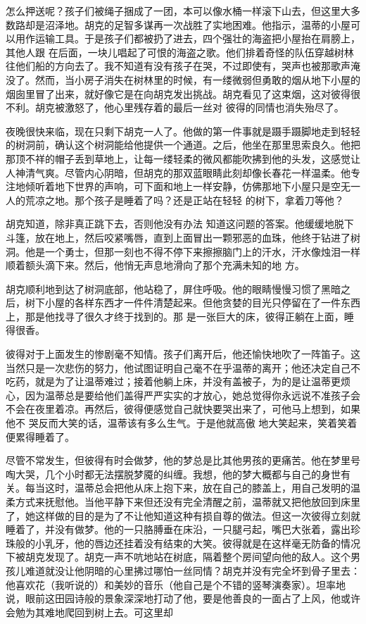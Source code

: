 \documentclass{article}
\begin{document}
怎么押送呢？孩子们被绳子捆成了一团，本可以像水桶一样滚下山去，但这里大多数路却是沼泽地。胡克的足智多谋再一次战胜了实地困难。他指示，温蒂的小屋可以用作运输工具。于是孩子们都被扔了进去，四个强壮的海盗把小屋抬在肩膀上，其他人跟
\newpage
在后面，一块儿唱起了可恨的海盗之歌。他们排着奇怪的队伍穿越树林往他们船的方向去了。我不知道有没有孩子在哭，不过即使有，哭声也被那歌声淹没了。然而，当小房子消失在树林里的时候，有一缕微弱但勇敢的烟从地下小屋的烟囱里冒了出来，就好像它是在向胡克发出挑战。胡克看见了这束烟，这对彼得很不利。胡克被激怒了，他心里残存着的最后一丝对
彼得的同情也消失殆尽了。 

夜晚很快来临，现在只剩下胡克一人了。他做的第一件事就是蹑手蹑脚地走到轻轻的树洞前，确认这个树洞能给他提供一个通道。之后，他坐在那里思索良久。他把那顶不祥的帽子丢到草地上，让每一缕轻柔的微风都能吹拂到他的头发，这感觉让人神清气爽。尽管内心阴暗，但胡克的那双蓝眼睛此刻却像长春花一样温柔。他专注地倾听着地下世界的声响，可下面和地上一样安静，仿佛那地下小屋只是空无一人的荒凉之地。那个孩子是睡着了吗？还是正站在轻轻
的树下，拿着刀等他？ 

胡克知道，除非真正跳下去，否则他没有办法
\newpage
知道这问题的答案。他缓缓地脱下斗篷，放在地上，然后咬紧嘴唇，直到上面冒出一颗邪恶的血珠，他终于钻进了树洞。他是一个勇士，但那一刻也不得不停下来擦擦脑门上的汗水，汗水像烛泪一样顺着额头滴下来。然后，他悄无声息地滑向了那个充满未知的地
方。 

胡克顺利地到达了树洞底部，他站稳了，屏住呼吸。他的眼睛慢慢习惯了黑暗之后，树下小屋的各样东西才一件件清楚起来。但他贪婪的目光只停留在了一件东西上，那是他找寻了很久才终于找到的。那
是一张巨大的床，彼得正躺在上面，睡得很香。 

彼得对于上面发生的惨剧毫不知情。孩子们离开后，他还愉快地吹了一阵笛子。这当然只是一次悲伤的努力，他试图证明自己毫不在乎温蒂的离开；他还决定自己不吃药，就是为了让温蒂难过；接着他躺上床，并没有盖被子，为的是让温蒂更烦心，因为温蒂总是要给他们盖得严严实实的才放心，她总觉得你永远说不准孩子会不会在夜里着凉。再然后，彼得便感觉自己就快要哭出来了，可他马上想到，如果他不
\newpage
哭反而大笑的话，温蒂该有多么生气。于是他就高傲
地大笑起来，笑着笑着便累得睡着了。 

尽管不常发生，但彼得有时会做梦，他的梦总是比其他男孩的更痛苦。他在梦里号啕大哭，几个小时都无法摆脱梦魇的纠缠。我想，他的梦大概都与自己的身世有关。每当这时，温蒂总会把他从床上抱下来，放在自己的膝盖上，用自己发明的温柔方式来抚慰他。当他平静下来但还没有完全清醒之前，温蒂就又把他放回到床里了，她这样做的目的是为了不让他知道这种有损自尊的做法。但这一次彼得立刻就睡着了，并没有做梦。他的一只胳膊垂在床沿，一只腿弓起，嘴巴大张着，露出珍珠般的小乳牙，他的唇边还挂着没有结束的大笑。彼得就是在这样毫无防备的情况下被胡克发现了。胡克一声不吭地站在树底，隔着整个房间望向他的敌人。这个男孩儿难道就没让他阴暗的心里拂过哪怕一丝同情？胡克并没有完全坏到骨子里去：他喜欢花（我听说的）和美妙的音乐（他自己是个不错的竖琴演奏家）。坦率地说，眼前这田园诗般的景象深深地打动了他，要是他善良的一面占了上风，他或许会勉为其难地爬回到树上去。可这里却
\newpage
\end{document}
